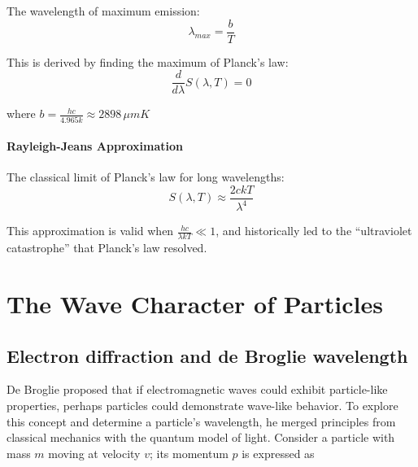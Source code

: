 \documentclass[
  a4paper,
]{book}
\begin{document}
\begin{tcolorbox}[enhanced jigsaw, coltitle=black, title=\textcolor{quarto-callout-note-color}{\faInfo}\hspace{0.5em}{Wien's Displacement Law}, colframe=quarto-callout-note-color-frame, toprule=.15mm, opacitybacktitle=0.6, left=2mm, opacityback=0, breakable, toptitle=1mm, bottomtitle=1mm, leftrule=.75mm, arc=.35mm, titlerule=0mm, colbacktitle=quarto-callout-note-color!10!white, rightrule=.15mm, bottomrule=.15mm, colback=white]

The wavelength of maximum emission: \[\lambda_{max} = \frac{b}{T}\]

This is derived by finding the maximum of Planck's law:
\[\frac{d}{d\lambda}S(\lambda,T) = 0\]

where \(b = \frac{hc}{4.965k} \approx 2898\, \mu m K\)

\subsubsection{Rayleigh-Jeans
Approximation}\label{rayleigh-jeans-approximation}

The classical limit of Planck's law for long wavelengths:
\[S(\lambda,T) \approx \frac{2ckT}{\lambda^4}\]

This approximation is valid when \(\frac{hc}{\lambda kT} \ll 1\), and
historically led to the ``ultraviolet catastrophe'' that Planck's law
resolved.

\end{tcolorbox}

\chapter{The Wave Character of
Particles}\label{the-wave-character-of-particles}

\section{Electron diffraction and de Broglie
wavelength}\label{electron-diffraction-and-de-broglie-wavelength}

De Broglie proposed that if electromagnetic waves could exhibit
particle-like properties, perhaps particles could demonstrate wave-like
behavior. To explore this concept and determine a particle's wavelength,
he merged principles from classical mechanics with the quantum model of
light. Consider a particle with mass \(m\) moving at velocity \(v\); its
momentum \(p\) is expressed as
\end{document}

